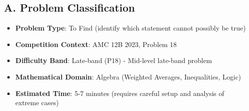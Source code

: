 \documentclass[12pt]{article}
\begin{document}
\begin{problemconfigbox}
\subsection*{A. Problem Classification}
\begin{itemize}[leftmargin=*]
    \item \textbf{Problem Type}: To Find (identify which statement cannot possibly be true)
    \item \textbf{Competition Context}: AMC 12B 2023, Problem 18
    \item \textbf{Difficulty Band}: Late-band (P18) - Mid-level late-band problem
    \item \textbf{Mathematical Domain}: Algebra (Weighted Averages, Inequalities, Logic)
    \item \textbf{Estimated Time}: 5-7 minutes (requires careful setup and analysis of extreme cases)
\end{itemize}


\end{problemconfigbox}
\end{document}

